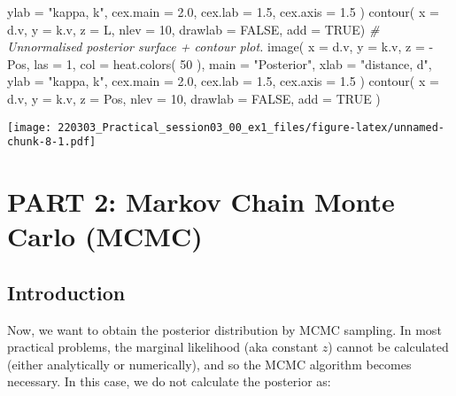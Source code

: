 \documentclass[
]{article}
\newenvironment{Shaded}{\begin{snugshade}}{\end{snugshade}}
\newcommand{\AttributeTok}[1]{\textcolor[rgb]{0.77,0.63,0.00}{#1}}
\newcommand{\CommentTok}[1]{\textcolor[rgb]{0.56,0.35,0.01}{\textit{#1}}}
\newcommand{\ConstantTok}[1]{\textcolor[rgb]{0.00,0.00,0.00}{#1}}
\newcommand{\DecValTok}[1]{\textcolor[rgb]{0.00,0.00,0.81}{#1}}
\newcommand{\FloatTok}[1]{\textcolor[rgb]{0.00,0.00,0.81}{#1}}
\newcommand{\FunctionTok}[1]{\textcolor[rgb]{0.00,0.00,0.00}{#1}}
\newcommand{\NormalTok}[1]{#1}
\newcommand{\SpecialCharTok}[1]{\textcolor[rgb]{0.00,0.00,0.00}{#1}}
\newcommand{\StringTok}[1]{\textcolor[rgb]{0.31,0.60,0.02}{#1}}
\begin{document}
\begin{Shaded}
\begin{Highlighting}[]
       \AttributeTok{ylab =} \StringTok{"kappa, k"}\NormalTok{, }\AttributeTok{cex.main =} \FloatTok{2.0}\NormalTok{,}
       \AttributeTok{cex.lab =} \FloatTok{1.5}\NormalTok{, }\AttributeTok{cex.axis =} \FloatTok{1.5}\NormalTok{ )}
\FunctionTok{contour}\NormalTok{( }\AttributeTok{x =}\NormalTok{ d.v, }\AttributeTok{y =}\NormalTok{ k.v, }\AttributeTok{z =}\NormalTok{ L, }\AttributeTok{nlev =} \DecValTok{10}\NormalTok{,}
         \AttributeTok{drawlab =} \ConstantTok{FALSE}\NormalTok{, }\AttributeTok{add =} \ConstantTok{TRUE}\NormalTok{)}
\CommentTok{\# Unnormalised posterior surface + contour plot.}
\FunctionTok{image}\NormalTok{( }\AttributeTok{x =}\NormalTok{ d.v, }\AttributeTok{y =}\NormalTok{ k.v, }\AttributeTok{z =} \SpecialCharTok{{-}}\NormalTok{Pos, }\AttributeTok{las =} \DecValTok{1}\NormalTok{, }\AttributeTok{col =} \FunctionTok{heat.colors}\NormalTok{( }\DecValTok{50}\NormalTok{ ),}
       \AttributeTok{main =} \StringTok{"Posterior"}\NormalTok{, }\AttributeTok{xlab =} \StringTok{"distance, d"}\NormalTok{,}
       \AttributeTok{ylab =} \StringTok{"kappa, k"}\NormalTok{, }\AttributeTok{cex.main =} \FloatTok{2.0}\NormalTok{,}
       \AttributeTok{cex.lab =} \FloatTok{1.5}\NormalTok{, }\AttributeTok{cex.axis =} \FloatTok{1.5}\NormalTok{ )}
\FunctionTok{contour}\NormalTok{( }\AttributeTok{x =}\NormalTok{ d.v, }\AttributeTok{y =}\NormalTok{ k.v, }\AttributeTok{z =}\NormalTok{ Pos, }\AttributeTok{nlev =} \DecValTok{10}\NormalTok{,}
         \AttributeTok{drawlab =} \ConstantTok{FALSE}\NormalTok{, }\AttributeTok{add =} \ConstantTok{TRUE}\NormalTok{ )}
\end{Highlighting}
\end{Shaded}

\texttt{[image: 220303\_Practical\_session03\_00\_ex1\_files/figure-latex/unnamed-chunk-8-1.pdf]}

\hypertarget{part-2-markov-chain-monte-carlo-mcmc}{%
\section{PART 2: Markov Chain Monte Carlo
(MCMC)}\label{part-2-markov-chain-monte-carlo-mcmc}}

\hypertarget{introduction-1}{%
\subsection{Introduction}\label{introduction-1}}

Now, we want to obtain the posterior distribution by MCMC sampling. In
most practical problems, the marginal likelihood (aka constant \(z\))
cannot be calculated (either analytically or numerically), and so the
MCMC algorithm becomes necessary. In this case, we do not calculate the
posterior as:
\end{document}
